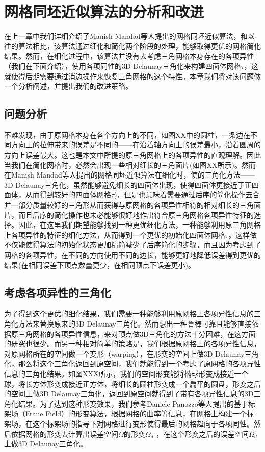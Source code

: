 \chapter{网格同坯近似算法的分析和改进}

在上一章中我们详细介绍了Manish Mandad等人提出的网格同坯近似算法\cite{isotopic-appro}，和以往的算法相比，该算法通过细化和简化两个阶段的处理，能够取得更优的网格简化结果。然而，在细化过程中，该算法并没有去考虑三角网格本身存在的各项异性（我们在下面介绍），使用各项同性的3D Delaunay三角化来构建四面体网格$\tau$，这就使得后期需要通过消边操作来恢复三角网格的这个特性。本章我们将对该问题做一个分析阐述，并提出我们的改进策略。

\section{问题分析}
不难发现，由于原网格本身在各个方向上的不同，如图XX中的圆柱，一条边在不同方向上的拉伸带来的误差是不同的——在沿着轴方向上的误差最小，沿着圆周的方向上误差最大。这也是本文中所提的原三角网格上的各项异性的直观理解。因此当我们在简化网格时，必然会出现一些相对细长的三角面片(如图XX所示)。然而在Manish Mandad等人提出的网格同坯近似算法在细化时，使的三角化方法——3D Delaunay三角化，虽然能够避免细长的四面体出现，使得四面体更接近于正四面体，从而得到较好的四面体网格$\tau$)，但是也意味着需要通过后序的简化操作去合并一部分质量较好的三角形从而获得与原网格的各项异性相符的相对细长的三角面片，而且后序的简化操作也未必能够很好地作出符合原三角网格各项异性特征的选择。因此，在这里我们期望能够找到一种更优细化方法，一种能够利用原三角网格上各项异性的特征的细化方法，从而得到一个更优的初始化四面体网格$\tau$。这样做不仅能使得算法的初始化状态更加精简减少了后序简化的步骤，而且因为考虑到了网格的各项异性，在不同的方向使用不同的边长，能够更好地降低误差得到更优的结果(在相同误差下顶点数量更少，在相同顶点下误差更小)。

\section{考虑各项异性的三角化}
为了得到这个更优的细化结果，我们需要一种能够利用原网格上各项异性信息的三角化方法来替换原来的3D Delaunay三角化。然而想出一种鲁棒可靠且能够直接依据原三角网格的各项异性信息，来对顶点做3D三角化的方法十分困难，在这方面的研究也很少。而另一种相对简单的策略是，我们根据原网格上的各项异性信息，对原网格所在的空间做一个变形（warping），在形变的空间上做3D Delaunay三角化，那么将这个三角化返回到原空间，我们就能得到一个考虑了原网格的各项异性信息的三角化结果。如图XXX所示，我们的空间形变能将椭球形变成接近一个球，将长方体形变成接近正方体，将细长的圆柱形变成一个扁平的圆盘，形变之后的空间上做3D Delaunay三角化，返回到原空间就得到了带有各项异性信息的3D三角化结果。为了达到这种形变效果，我们参考Daniele Panozzo等人提出的基于标架场（Frane Field）的形变算法，根据网格的曲率等信息，在网格上构建一个标架场，在这个标架场的指导下对网格进行变形使得最后的网格趋向于各项同性。然后依据网格的形变去计算出误差空间$\Omega$的形变$\Omega_d$ ，在这个形变之后的误差空间$\Omega_d$上做3D Delaunay三角化。


